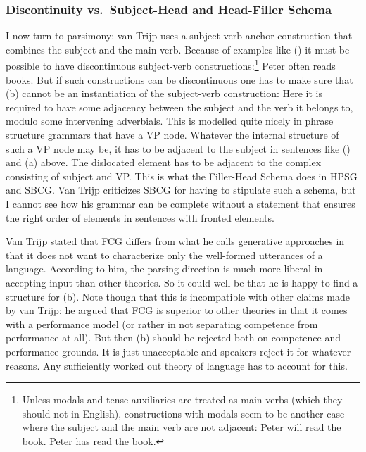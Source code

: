 \subsubsection{Discontinuity vs.\ Subject-Head and Head-Filler Schema}
\label{sec-discontinuous-constituents-fcg}

I now turn to parsimony: van Trijp uses a subject-verb anchor construction that combines the subject
and the main verb. Because of examples like () it must be possible to have discontinuous subject-verb constructions:\footnote{%
  Unless modals and tense auxiliaries are treated as main verbs (which they should not in English), constructions with
  modals seem to be another case where the subject and the main verb are not adjacent:
  \eal
  \ex Peter will read the book.
  \ex Peter has read the book.
  \zllast
} 
\ea
Peter often reads books.
\z
\largerpage
But if such constructions can be discontinuous one has to make sure that (b) cannot be an
instantiation of the subject-verb construction:
\eal
{}
\zl
Here it is required to have some adjacency between the subject and the verb it belongs to, modulo
some intervening adverbials. This is modelled quite nicely in phrase structure grammars that have a
VP node. Whatever the internal structure of such a VP node may be, it has to be adjacent to the
subject in sentences like  () and (a) above. The dislocated element has to be adjacent to the complex
consisting of subject and VP. This is what the Filler-Head Schema does in HPSG and SBCG. Van Trijp
criticizes SBCG for having to stipulate such a schema, but I cannot see how his grammar can be
complete without a statement that ensures the right order of elements in sentences with fronted
elements.

Van Trijp stated that FCG differs from what he calls generative approaches in that it does not want
to characterize only the well-formed utterances of a language. According to him, the parsing direction
 is much more liberal in accepting input than other theories. So it could well be that he
is happy to find a structure for (b). Note though that this is incompatible with other claims
made by van Trijp: he argued that FCG is superior to other theories in that it comes with a performance
model (or rather in not separating competence from performance at all). But then (b) should be
rejected both on competence and performance grounds. It is just unacceptable and speakers reject it
for whatever reasons. Any sufficiently worked out theory of language has to account for this.


